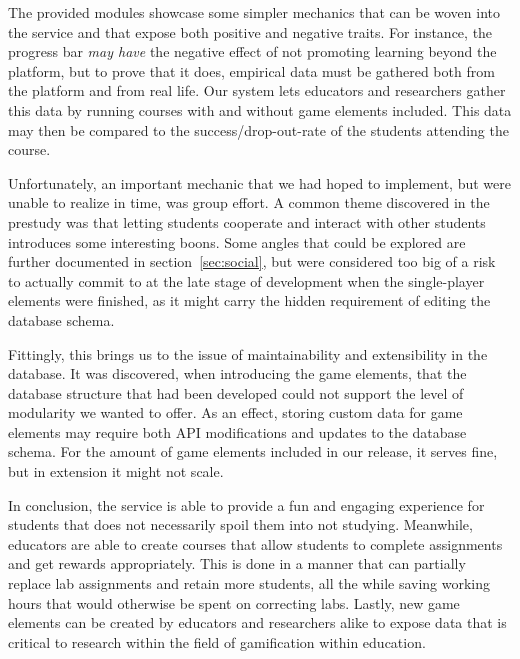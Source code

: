 The provided modules showcase some simpler mechanics that can be woven into the service and that expose both positive and negative traits. For instance, the progress bar \emph{may have} the negative effect of not promoting learning beyond the platform, but to prove that it does, empirical data must be gathered both from the platform and from real life. Our system lets educators and researchers gather this data by running courses with and without game elements included. This data may then be compared to the success/drop-out-rate of the students attending the course.

Unfortunately, an important mechanic that we had hoped to implement, but were unable to realize in time, was group effort. A common theme discovered in the prestudy was that letting students cooperate and interact with other students introduces some interesting boons. Some angles that could be explored are further documented in section~\ref{sec:social}, but were considered too big of a risk to actually commit to at the late stage of development when the single-player elements were finished, as it might carry the hidden requirement of editing the database schema.

Fittingly, this brings us to the issue of maintainability and extensibility in the database. It was discovered, when introducing the game elements, that the database structure that had been developed could not support the level of modularity we wanted to offer. As an effect, storing custom data for game elements may require both API modifications and updates to the database schema. For the amount of game elements included in our release, it serves fine, but in extension it might not scale.

In conclusion, the service is able to provide a fun and engaging experience for students that does not necessarily spoil them into not studying. Meanwhile, educators are able to create courses that allow students to complete assignments and get rewards appropriately. This is done in a manner that can partially replace lab assignments and retain more students, all the while saving working hours that would otherwise be spent on correcting labs. Lastly, new game elements can be created by educators and researchers alike to expose data that is critical to research within the field of gamification within education.




